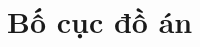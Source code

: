 \documentclass[../DoAn.tex]{subfiles}
\begin{document}
\section{Bố cục đồ án}
\label{section:1.4}
%
%
%
%
%
%
\end{document}
